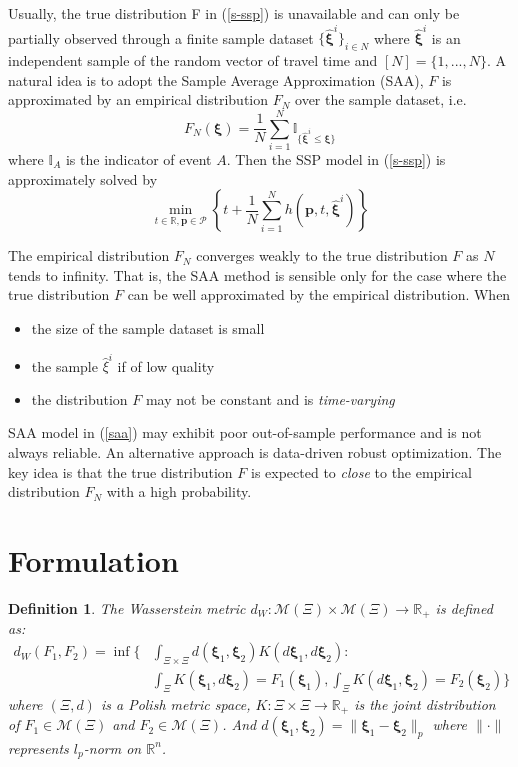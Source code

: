 \documentclass{article}
\newtheorem{defin}{Definition}
\begin{document}
Usually, the true distribution F in (\ref{s-ssp}) is unavailable and can only be partially observed through a finite sample dataset $\{\hat{\bm{\xi}}^i\}_{i \in N}$
where $\hat{\bm{\xi}}^i$ is an independent sample of the random vector of travel time and $[N]=\{1,...,N\}$. A natural idea is to adopt the Sample Average Approximation (SAA), $F$ is approximated by an empirical distribution $F_N$ over the sample dataset, i.e.
\begin{equation}
	F_N(\bm{\xi}) = \frac{1}{N} \sum_{i=1}^{N} \mathbb{I}_{\{\hat{\bm{\xi}}^i \leq \bm{\xi}\}}
\end{equation}
where $\mathbb{I}_A$ is the indicator of event $A$. Then the SSP model in (\ref{s-ssp}) is approximately solved by
\begin{equation} \label{saa}
	\min_{t \in \mathbb{R}, \bm{p} \in \mathcal{P}} \left\{t + \frac{1}{N} \sum_{i=1}^{N} h(\bm{p}, t, \hat{\bm{\xi}}^i)\right\} 
\end{equation}

The empirical distribution $F_N$ converges weakly to the true distribution $F$ as $N$ tends to infinity. That is, the SAA method is sensible only for the case where the true distribution $F$ can be well approximated by the empirical distribution. When
\begin{itemize}
	\item the size of the sample dataset is small
	\item the sample $\hat{\xi}^i$ if of low quality
	\item the distribution $F$ may not be constant and is \textit{time-varying}
\end{itemize}
SAA model in (\ref{saa}) may exhibit poor out-of-sample performance and is not always reliable. An alternative approach is data-driven robust optimization. The key idea is that the true distribution $F$ is expected to \textit{close} to the empirical distribution $F_N$ with a high probability.

\section{Formulation}

\begin{defin}
	The Wasserstein metric $d_W:\mathcal{M}(\Xi) \times \mathcal{M}(\Xi) \rightarrow \mathbb{R}_+$ is defined as:
	\begin{align}
		d_W(F_1, F_2)  = \inf \Bigg\{ &	\int_{\Xi \times \Xi} d(\bm{\xi}_1, \bm{\xi}_2) K(d \bm{\xi}_1, d\bm{\xi}_2) : \\
		& \int_{\Xi} K(\bm{\xi}_1, d\bm{\xi}_2) = F_1(\bm{\xi}_1), \int_{\Xi} K(d\bm{\xi}_1, \bm{\xi}_2) = F_2(\bm{\xi}_2)  \Bigg\}
	\end{align}
	where $(\Xi, d)$ is a Polish metric space, $K: \Xi \times \Xi \rightarrow \mathbb{R}_+$ is the joint distribution of $F_1 \in \mathcal{M}(\Xi)$ and $F_2 \in \mathcal{M}(\Xi)$. And $d(\bm{\xi}_1, \bm{\xi}_2) = \|\bm{\xi}_1 - \bm{\xi}_2\|_p$ where $\| \cdot \|$ represents $l_p$-norm on $\mathbb{R}^n$.
\end{defin}
\end{document}

